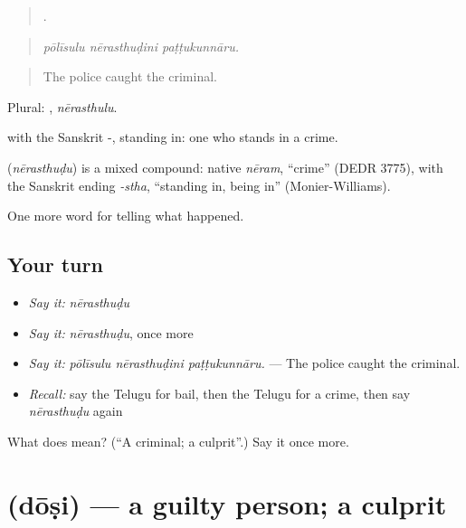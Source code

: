\begin{quote}
  .
\end{quote}

\begin{quote}
\emph{pōlīsulu nērasthuḍini paṭṭukunnāru.}
\end{quote}

\begin{quote}
The police caught the criminal.
\end{quote}

Plural: , \emph{nērasthulu}.

 with the Sanskrit -, standing in: one who stands in a crime.

\begin{cousinweb}
\textbf{} (\emph{nērasthuḍu}) is a mixed compound: native \emph{nēram}, \textquotedblleft{}crime\textquotedblright{} (DEDR 3775), with the Sanskrit ending \emph{-stha}, \textquotedblleft{}standing in, being in\textquotedblright{} (Monier-Williams).
\end{cousinweb}

\begin{grammarlens}[title={What you've built}]
One more word for telling what happened.
\end{grammarlens}

\subsection*{Your turn}
\begin{itemize}
\raggedright
  \item \emph{Say it:} \emph{nērasthuḍu}
  \item \emph{Say it:} \emph{nērasthuḍu}, once more
  \item \emph{Say it:} \emph{pōlīsulu nērasthuḍini paṭṭukunnāru.} — The police caught the criminal.
  \item \emph{Recall:} say the Telugu for bail, then the Telugu for a crime, then say \emph{nērasthuḍu} again
\end{itemize}

\begin{tcolorbox}[breakable,colback=teal!4,colframe=teal!35!black,title={Before you move on}]
What does  mean? (\textquotedblleft{}A criminal; a culprit\textquotedblright{}.) Say it once more.
\end{tcolorbox}
\section[\texorpdfstring{\te{దోషి} (dōṣi)}{దోషి (dōṣi)}]{ (dōṣi) — a guilty person; a culprit}

